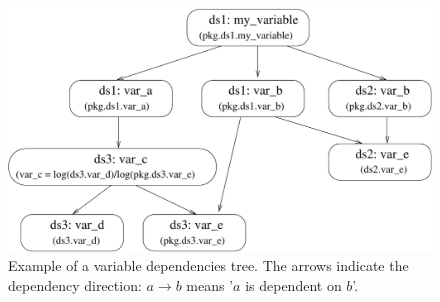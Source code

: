 \begin{figure}
\begin{center}
\includegraphics[scale=0.6]{images/variabletreeinitial.pdf}
\caption{\label{fig:opus-core-variable-tree}\small Example of a variable
  dependencies tree. The arrows indicate the dependency direction: 
  $a \longrightarrow b$ means '$a$ is dependent on $b$'.}
\end{center}
\end{figure}


